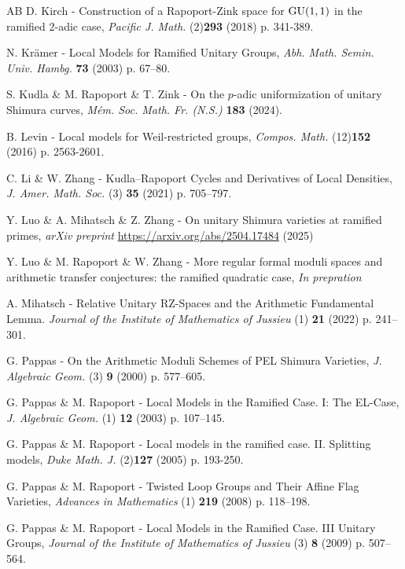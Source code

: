 \documentclass[pdflatex,sn-mathphys-num]{sn-jnl}%
\theoremstyle{thmstyleone}%
\theoremstyle{thmstyletwo}%
\numberwithin{equation}{subsection}
\theoremstyle{thmstylethree}%
\begin{document}
\begin{thebibliography}{AB}
D. Kirch  - Construction of a {R}apoport-{Z}ink space for {${\rm GU}(1,1)$} in the ramified 2-adic case,
\emph{Pacific J. Math.} (2)\textbf{293} (2018) p. 341-389.


N. Krämer - Local Models for Ramified Unitary Groups, 
\emph{Abh. Math. Semin. Univ. Hambg.} \textbf{73} (2003) p. 67–80. 

S. Kudla \& M. Rapoport \&  T. Zink - On the {$p$}-adic uniformization of unitary {S}himura curves,
\emph{M\'em. Soc. Math. Fr. (N.S.)} \textbf{183} (2024).

B. Levin - Local models for {W}eil-restricted groups,
\emph{Compos. Math.} (12)\textbf{152} (2016) p. 2563-2601. 

C. Li \& W. Zhang - Kudla–Rapoport Cycles and Derivatives of Local Densities, 
\emph{J. Amer. Math. Soc.} (3) \textbf{35} (2021) p. 705–797. 	

Y. Luo \& A. Mihatsch \& Z. Zhang - On unitary {S}himura varieties at ramified primes,
\emph{arXiv preprint} \url{https://arxiv.org/abs/2504.17484} (2025)

Y. Luo \& M. Rapoport \& W. Zhang - More regular formal moduli spaces and arithmetic transfer conjectures: the ramified quadratic case,
\emph{In prepration}


	

A. Mihatsch - Relative Unitary RZ-Spaces and the Arithmetic Fundamental Lemma. \emph{Journal of the Institute of Mathematics of Jussieu} (1) \textbf{21} (2022) p. 241–301. 

   
G. Pappas - On the Arithmetic Moduli Schemes of PEL Shimura Varieties,
\emph{J. Algebraic Geom.} (3) \textbf{9} (2000) p. 577–605.
			
G. Pappas \& M. Rapoport - Local Models in the Ramified Case. I: The EL-Case,
\emph{J. Algebraic Geom.} (1) \textbf{12} (2003) p. 107–145.

G. Pappas \& M. Rapoport - Local models in the ramified case. {II}. {S}plitting models,
\emph{Duke Math. J.} (2)\textbf{127} (2005) p. 193-250.

G. Pappas \& M. Rapoport - Twisted Loop Groups and Their Affine Flag Varieties, \emph{Advances in Mathematics} (1) \textbf{219} (2008) p. 118–198. 
			
G. Pappas \& M. Rapoport - Local Models in the Ramified Case. III Unitary Groups, \emph{Journal of the Institute of Mathematics of Jussieu} (3) \textbf{8} (2009) p. 507–564. 


\end{thebibliography}
\end{document}
